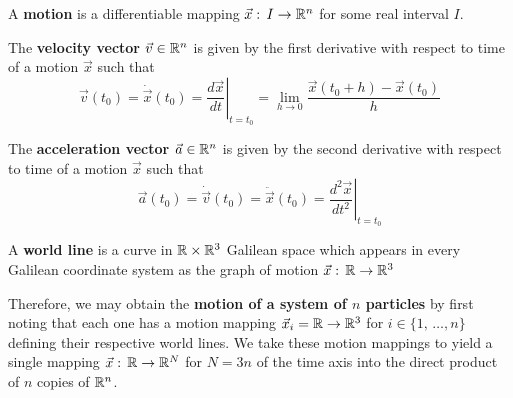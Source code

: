 \documentclass{article}
\begin{document}
		\begin{defn}
			A \textbf{motion} is a differentiable mapping $\vec{x}: \, I \to \mathbb{R}^n$ for some real interval $I$. 
		\end{defn}
		\begin{defn}
			The \textbf{velocity vector $\vec{v} \in \mathbb{R}^n$} is given by the first derivative with respect to time of a motion $\vec{x}$ such that
			\begin{equation}
				\label{eq:VelocityVector}
				\vec{v} \left(t_0 \right) = \dot{\vec{x}} \left( t_0 \right) = \left. \frac{d\vec{x}}{dt} \right|_{t = t_0} = \lim_{h\to 0} \frac{\vec{x} \left(t_0 + h\right) - \vec{x} \left( t_0\right)}{h}
			\end{equation}
		\end{defn}
		\begin{defn}
			The \textbf{acceleration vector $\vec{a} \in \mathbb{R}^n$} is given by the second derivative with respect to time of a motion $\vec{x}$ such that
			\begin{equation}
				\label{eq:AccelerationVector}
				\vec{a} \left(t_0 \right) = \dot{\vec{v}} \left( t_0 \right) = \ddot{\vec{x}}\left(t_0\right) =\left. \frac{d^2\vec{x}}{dt^2} \right|_{t = t_0}
			\end{equation}
		\end{defn}
		\begin{defn}
			A \textbf{world line} is a curve in $\mathbb{R} \times \mathbb{R}^3$ Galilean space which appears in every Galilean coordinate system as the graph of motion $\vec{x} : \, \mathbb{R} \to \mathbb{R}^3$
		\end{defn}
		Therefore, we may obtain the \textbf{motion of a system of $n$ particles} by first noting that each one has a motion mapping $\vec{x}_i = \mathbb{R} \to \mathbb{R}^3$ for $i \in \{ 1, \, \dots, n\}$ defining their respective world lines. We take these motion mappings to yield a single mapping $\vec{x}: \, \mathbb{R} \to \mathbb{R}^N$ for $N = 3n$ of the time axis into the direct product of $n$ copies of $\mathbb{R}^n$.
		
		\newpage
\end{document}
